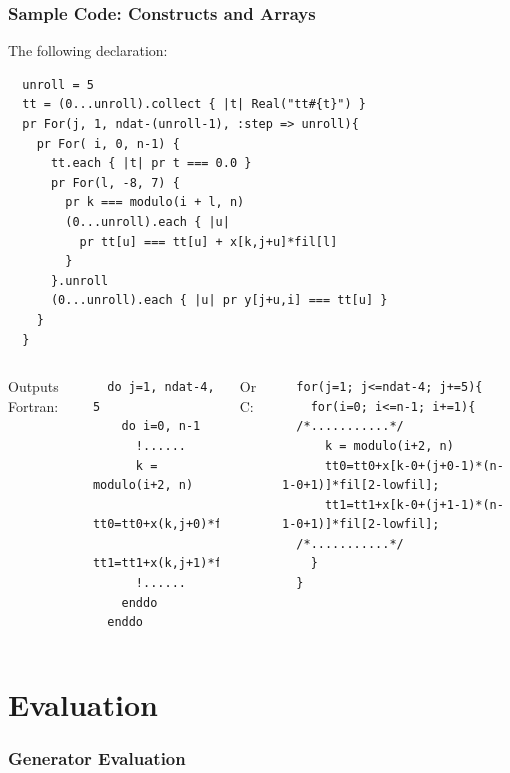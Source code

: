 \documentclass{beamer}
\begin{document}
\begin{frame}[fragile]
\frametitle{Sample Code: Constructs and Arrays}
The following declaration:
\tiny
\lstset{style=BOAST}
\begin{lstlisting}
  unroll = 5
  tt = (0...unroll).collect { |t| Real("tt#{t}") }
  pr For(j, 1, ndat-(unroll-1), :step => unroll){
    pr For( i, 0, n-1) {
      tt.each { |t| pr t === 0.0 }
      pr For(l, -8, 7) {
        pr k === modulo(i + l, n)
        (0...unroll).each { |u|
          pr tt[u] === tt[u] + x[k,j+u]*fil[l]
        }
      }.unroll
      (0...unroll).each { |u| pr y[j+u,i] === tt[u] }
    }
  }
\end{lstlisting}
\begin{columns}

\normalsize 
Outputs Fortran:
\tiny
\lstset{style=Fortran}
\begin{lstlisting}
  do j=1, ndat-4, 5
    do i=0, n-1
      !......
      k = modulo(i+2, n)
      tt0=tt0+x(k,j+0)*fil(2)
      tt1=tt1+x(k,j+1)*fil(2)
      !......
    enddo
  enddo
\end{lstlisting}
\normalsize
Or C:
\tiny
\lstset{style=C}
\begin{lstlisting}
  for(j=1; j<=ndat-4; j+=5){
    for(i=0; i<=n-1; i+=1){
  /*...........*/
      k = modulo(i+2, n)
      tt0=tt0+x[k-0+(j+0-1)*(n-1-0+1)]*fil[2-lowfil];
      tt1=tt1+x[k-0+(j+1-1)*(n-1-0+1)]*fil[2-lowfil];
  /*...........*/
    }
  }
\end{lstlisting}
\end{columns}
\end{frame}

\section{Evaluation}
\begin{frame}
\frametitle{Generator Evaluation}

\end{frame}
\end{document}
